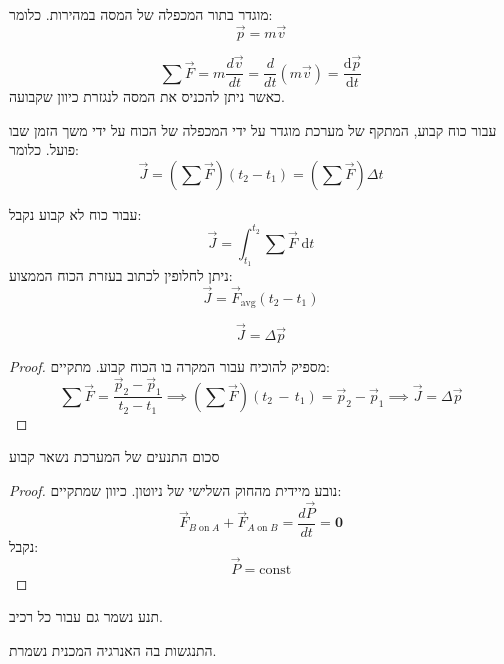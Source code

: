 \documentclass{tstextbook}
\begin{document}
\begin{reminder}[תנע]
מוגדר בתור המכפלה של המסה במהירות. כלומר:
$$\vec{p}=m\vec{v}$$

\end{reminder}
\begin{proposition}
$${\textstyle\sum}{\vec{F}}=m{\frac{d{\vec{v}}}{d t}}={\frac{d}{d t}}\left( m{\vec{v}} \right)=\frac{\mathrm{d} \vec{p}}{\mathrm{d} t} $$
כאשר ניתן להכניס את המסה לנגזרת כיוון שקבועה.

\end{proposition}
\begin{definition}[מתקף]
עבור כוח קבוע, המתקף של מערכת מוגדר על ידי המכפלה של הכוח על ידי משך הזמן שבו פועל. כלומר:
$$\vec{J}=\left( \sum\vec{F} \right)(t_{2}-t_{1})=\left( \sum\vec{F} \right)\Delta t$$

\end{definition}
\begin{corollary}
עבור כוח לא קבוע נקבל:
$$\vec{J}=\int _{t_{1}}^{t_{2}} \sum\vec{F} \;\mathrm{d} t $$
ניתן לחלופין לכתוב בעזרת הכוח הממצוע:
$$\vec{J}=\vec{F}_{\text{avg}}(t_{2}-t_{1})$$

\end{corollary}
\begin{proposition}
$$\vec{J}=\Delta \vec{p}$$

\end{proposition}
\begin{proof}
מספיק להוכיח עבור המקרה בו הכוח קבוע. מתקיים:
$${\textstyle\sum}\vec{F}=\frac{\vec{p}_{2}-\vec{p}_{1}}{t_{2}-t_{1}}\implies \left( {\textstyle\sum}\vec{F} \right)\left( t_{2}\,-\,t_{1} \right)=\vec{p}_{2}-\vec{p}_{1}\implies \vec{J}=\Delta \vec{p}$$

\end{proof}
\begin{proposition}
סכום התנעים של המערכת נשאר קבוע

\end{proposition}
\begin{proof}
נובע מיידית מהחוק השלישי של ניוטון. כיוון שמתקיים:
$${\vec{F}}_{B\;\mathrm{on}\;A}+{\vec{F}}_{A\;\mathrm{on}\;B}={\frac{d{\vec{P}}}{d t}}=\mathbf{0}$$
נקבל:
$$\vec{P}=\text{const}$$

\end{proof}
\begin{corollary}
תנע נשמר גם עבור כל רכיב.

\end{corollary}
\begin{definition}
התנגשות בה האנרגיה המכנית נשמרת.

\end{definition}
\end{document}
